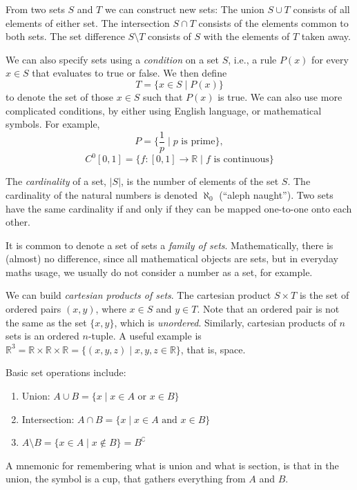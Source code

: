 From two sets $S$ and $T$ we can construct new sets: The union $S \cup T$ consists of all elements of either set. The intersection $S \cap T$ consists of the elements common to both sets. The set difference $S \setminus T$ consists of $S$ with the elements of $T$ taken away.

We can also specify sets using a \emph{condition} on a set $S$, i.e., a rule $P(x)$ for every $x\in S$ that evaluates to true or false. We then define
\begin{equation}
    T = \{ x \in S \mid P(x) \}
\end{equation}
to denote the set of those $x\in S$ such that $P(x)$ is true. We can also use more complicated conditions, by either using English language, or mathematical symbols. For example,
\begin{equation}
    P = \{ \frac{1}{p} \mid p \text{ is prime} \},
\end{equation}
\begin{equation}
    C^0[0,1] = \{ f : [0,1] \to \mathbb{R} \mid f \text{ is continuous} \}
\end{equation}

The \emph{cardinality} of a set, $|S|$, is the number of elements of the set $S$. The cardinality of the natural numbers is denoted $\aleph_0$ (``aleph naught''). Two sets have the same cardinality if and only if they can be mapped one-to-one onto each other.

It is common to denote a set of sets a \emph{family of sets}. Mathematically, there is (almost) no difference, since all mathematical objects are sets, but in everyday maths usage, we usually do not consider a number as a set, for example.

We can build \emph{cartesian products of sets}. The cartesian product $S\times T$ is the set of ordered pairs $(x,y)$, where $x\in S$ and $y \in T$. Note that an ordered pair is not the same as the set $\{x, y\}$, which is \emph{unordered}. Similarly, cartesian products of $n$ sets is an ordered $n$-tuple. A useful example is $\mathbb{R}^3 = \mathbb{R} \times \mathbb{R} \times \mathbb{R} = \{ (x,y,z) \mid x, y, z \in \mathbb{R}\}$, that is, space.

Basic set operations include:
\begin{enumerate}
    \item Union: $A \cup B = \{ x \mid x \in A \text{ or } x \in B \}$
    \item Intersection:  $A \cap B = \{ x \mid x \in A \text{ and } x \in B \}$
    \item $A \setminus B = \{ x \in A \mid x \notin B \} = B^\complement$
\end{enumerate}
A mnemonic for remembering what is union and what is section, is that in the union, the symbol is a cup, that gathers everything from $A$ and $B$.

